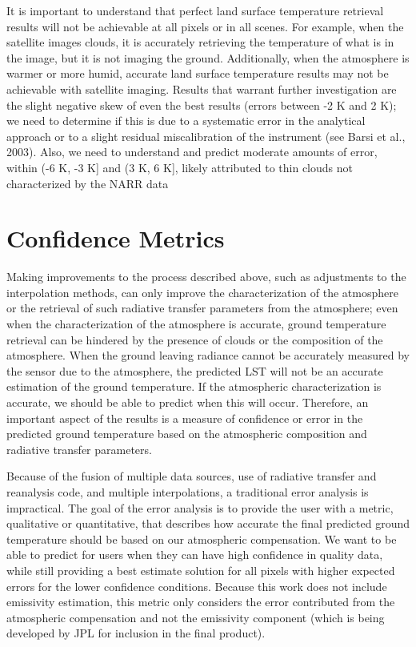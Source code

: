 \documentclass{book}
\begin{document}
It is important to understand that perfect land surface temperature retrieval results will not be achievable at all pixels or in all scenes.  For example, when the satellite images clouds, it is accurately retrieving the temperature of what is in the image, but it is not imaging the ground.  Additionally, when the atmosphere is warmer or more humid, accurate land surface temperature results may not be achievable with satellite imaging.  Results that warrant further investigation are the slight negative skew of even the best results (errors between -2 K and 2 K); we need to determine if this is due to a systematic error in the analytical approach or to a slight residual miscalibration of the instrument (see Barsi et al., 2003). Also, we need to understand and predict moderate amounts of error, within (-6 K, -3 K] and (3 K, 6 K], likely attributed to thin clouds not characterized by the NARR data

\section{Confidence Metrics}
\label{sec:confidencemetrics}

Making improvements to the process described above, such as adjustments to the interpolation methods, can only improve the characterization of the atmosphere or the retrieval of such radiative transfer parameters from the atmosphere; even when the characterization of the atmosphere is accurate, ground temperature retrieval can be hindered by the presence of clouds or the composition of the atmosphere.  When the ground leaving radiance cannot be accurately measured by the sensor due to the atmosphere, the predicted LST will not be an accurate estimation of the ground temperature.  If the atmospheric characterization is accurate, we should be able to predict when this will occur.  Therefore, an important aspect of the results is a measure of confidence or error in the predicted ground temperature based on the atmospheric composition and radiative transfer parameters.

Because of the fusion of multiple data sources, use of radiative transfer and reanalysis code, and multiple interpolations, a traditional error analysis is impractical.  The goal of the error analysis is to provide the user with a metric, qualitative or quantitative, that describes how accurate the final predicted ground temperature should be based on our atmospheric compensation.  We want to be able to predict for users when they can have high confidence in quality data, while still providing a best estimate solution for all pixels with higher expected errors for the lower confidence conditions.  Because this work does not include emissivity estimation, this metric only considers the error contributed from the atmospheric compensation and not the emissivity component (which is being developed by JPL for inclusion in the final product).
\end{document}
